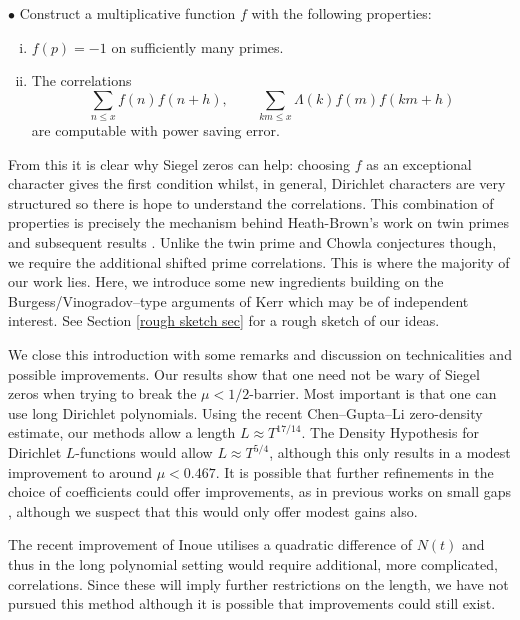 \documentclass[12pt, oneside]{amsart}
\theoremstyle{definition}
\newcommand{\leqs}{\leqslant }
\newcommand{\1}{\mathds{1}}
\begin{document}
\vspace{0.3cm}
\noindent $\bullet$ Construct a multiplicative function $f$ with the following properties:
\begin{enumerate}[(i)]
\item $f(p)=-1$ on sufficiently many primes.
\item The correlations 
\[
\sum_{n\leqs x}f(n)f(n+h),\qquad \sum_{km\leqs x}\Lambda(k)f(m)f(km+h)
\]
are computable with power saving error. 
\end{enumerate}

\vspace{0.3cm}

From this it is clear why Siegel zeros can help: choosing $f$ as an exceptional character gives the first condition whilst, in general, Dirichlet characters are very structured so there is hope to understand the correlations. This combination of properties is precisely the mechanism behind Heath-Brown's work on twin primes \cite{HB} and subsequent results \cite{Chinis,GM,TaoTeravainen}. Unlike the twin prime and Chowla conjectures though, we require the additional shifted prime correlations. This is where the majority of our work lies. Here, we introduce some new ingredients building on the Burgess/Vinogradov--type arguments of Kerr \cite{Kerr} which may be of independent interest. See Section \ref{rough sketch sec} for a rough sketch of our ideas.  


We close this introduction with some remarks and discussion on technicalities and possible improvements. Our results show that one need not be wary of Siegel zeros when trying to break the $\mu<1/2$-barrier. Most important is that one can use long Dirichlet polynomials.
Using the recent Chen--Gupta--Li \cite{ChenGuptaLi} zero-density estimate, our methods allow a length $L\approx T^{17/14}$. The Density Hypothesis for Dirichlet $L$-functions would allow  $L\approx T^{5/4}$, although this only results in a modest improvement to around $\mu<0.467$. It is possible that further refinements in the choice of coefficients could offer improvements, as in previous works on small gaps \cite{BMN, CGG, FW, P}, although we suspect that this would only offer modest gains also.   


The recent improvement of Inoue \cite{Inoue} utilises a quadratic difference of $N(t)$ and thus in the long polynomial setting would require additional, more complicated, correlations. Since these will imply further restrictions on the length, we have not pursued this method although it is possible that improvements could still exist. 
\end{document}
